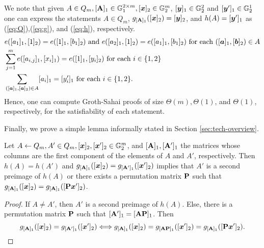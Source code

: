 We note that given $A\in Q_m,[\mathbf{{A}}]_1\in\mathbb{G}^{2\times m}_1,[{\boldsymbol{x}}]_2\in\mathbb{G}^m_2$, $[{\boldsymbol{y}}]_1\in\mathbb{G}_2^2$ and $[{\boldsymbol{y}}']_1\in\mathbb{G}^1_2$ one can express the statements $A\in Q_m$, $g_{[\mathbf{{A}}]_1}([{\boldsymbol{x}}]_2)=[{\boldsymbol{y}}]_2$, and $h(A)=[{\boldsymbol{y}}']_1$ as (\ref{eq:Q}),(\ref{eq:g}), and (\ref{eq:h}), respectively.
 \begin{align}
&e([a_{1}]_1,[1]_2) = e([1]_1,[{b}_1]_2)\text{ and }e([a_{2}]_1,[1]_2)=e([a_{1}]_1,[b_1]_2)
\text{ for each }([{\boldsymbol{a}}]_1,[{\boldsymbol{b}}]_2)\in A \label{eq:Q}\\
&\sum_{j=1}^m e([a_{i,j}]_1,[x_i]_1) = e([1]_1,[y_i]_2) \text{ for each } i\in\{1,2\} \label{eq:g}\\
&\sum_{([{\boldsymbol{a}}]_1,[{\boldsymbol{a}}]_2)\in A} [a_i]_1 = [y'_i]_1 \text{ for each } i\in\{1,2\}.\label{eq:h}
\end{align}
Hence, one can compute Groth-Sahai proofs of size $\Theta(m),\Theta(1)$, and $\Theta(1)$, respectively, for the satisfiability of each statement.

Finally, we prove a simple lemma informally stated in Section \ref{sec:tech-overview}.
\begin{lemma}\label{lemma:hg}
Let $A\gets Q_m,A'\in Q_m,[{\boldsymbol{x}}]_2,[{\boldsymbol{x}}']_2\in\mathbb{G}^m_2$, and $[\mathbf{{A}}]_1,[\mathbf{{A}}']_1$ the matrices whose columns are the first component of the elements of $A$ and $A'$, respectively. Then $h(A)=h(A')$ and $g_{[\mathbf{{A}}]_1}([{\boldsymbol{x}}]_2)=g_{[\mathbf{{A}}']_1}([{\boldsymbol{x}}']_2)$ implies that $A'$ is a second preimage of $h(A)$ or there exists a permutation matrix $\mathbf{{P}}$ such that $g_{[\mathbf{{A}}]_1}([{\boldsymbol{x}}]_2)=g_{[\mathbf{{A}}]_1}([\mathbf{{P}}{\boldsymbol{x}}']_2)$.
\end{lemma}
\begin{proof}
If $A\neq A'$, then $A'$ is a second preimage of $h(A)$. Else, there is a permutation matrix $\mathbf{{P}}$ such that $[\mathbf{{A}}']_1 =[\mathbf{{A}}\mathbf{{P}}]_1$. Then
$$
 g_{[\mathbf{{A}}]_1}([{\boldsymbol{x}}]_2)=g_{[\mathbf{{A}}']_1}([{\boldsymbol{x}}']_2)\Longleftrightarrow  g_{[\mathbf{{A}}]_1}([{\boldsymbol{x}}]_2)=g_{[\mathbf{{A}}\mathbf{{P}}]_1}([{\boldsymbol{x}}']_2)=g_{[\mathbf{{A}}]_1}([\mathbf{{P}}{\boldsymbol{x}}']_2).
$$
\end{proof}